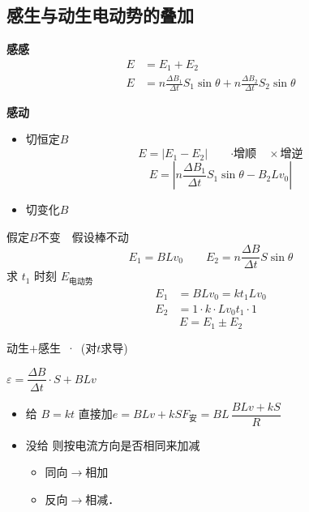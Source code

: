 \subsection{感生与动生电动势的叠加}
\textbf{感感}
\begin{align*}
E&=E_1+E_2\\
E&=n\frac{\Delta B_1}{\Delta t}S_1\sin\theta+n\frac{\Delta B_2}{\Delta t}S_2\sin\theta
\end{align*}

\textbf{感动}
\begin{itemize}
  \item 切恒定$B$
\[
E=|E_1-E_2|\qquad\text{·增顺　}\times\text{增逆}
\]
\[
E=\left|n\frac{\Delta B_1}{\Delta t}S_1\sin\theta-B_2Lv_0\right|
\]
  \item 切变化$B$
\end{itemize}
假定$B$不变　假设棒不动
\[
E_1=BLv_0\qquad E_2=n\frac{\Delta B}{\Delta t}S\sin\theta
\]
求 $t_1$ 时刻 $E_{\text{电动势}}$
\begin{align*}
E_1&=BLv_0=kt_1Lv_0\\
E_2&=1\cdot k\cdot Lv_0t_1\cdot1
\end{align*}
\[
E=E_1\pm E_2
\]

动生$+$感生\ ·\ (对$t$求导)

$\varepsilon=\dfrac{\Delta B}{\Delta t}\cdot S+BLv$

\begin{itemize}
\item 给 $B=kt$ 直接加\quad $e=BLv+kS$\quad $F_{\text{安}}=BL\,\dfrac{BLv+kS}{R}$
\item 没给 则按电流方向是否相同来加减
  \begin{itemize}
  \item 同向$\to$相加
  \item 反向$\to$相减．
  \end{itemize}
\end{itemize}

